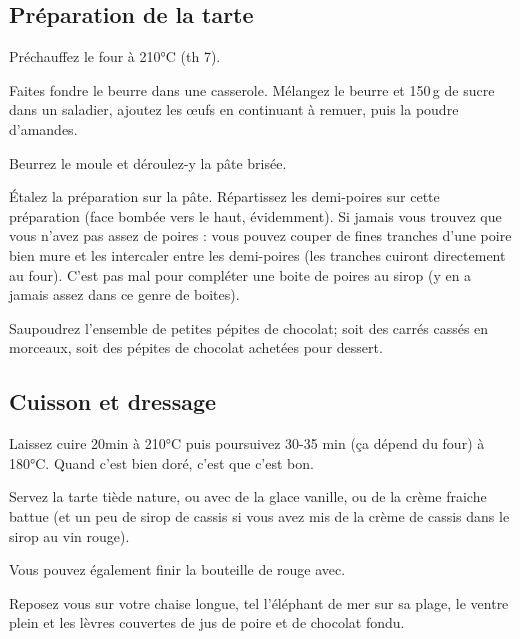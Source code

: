\subsection*{Préparation de la tarte}

\begin{instructions}
	
	\item Préchauffez le four à 210°C (th 7).
	\item Faites fondre le beurre dans une casserole. Mélangez le beurre et
	150\,g de sucre dans un saladier, ajoutez les œufs en continuant à remuer,
	puis la poudre d'amandes.
	\item Beurrez le moule et déroulez-y la pâte brisée.
	\item Étalez la préparation sur la pâte. Répartissez les demi-poires sur
	cette préparation (face bombée vers le haut, évidemment). Si jamais vous
	trouvez que vous n'avez pas assez de poires : vous pouvez couper de fines
	tranches d'une poire bien mure et les intercaler entre les demi-poires
	(les tranches cuiront directement au four). C'est pas mal pour compléter
	une boite de poires au sirop (y en a jamais assez dans ce genre de
	boites).
	\item Saupoudrez l'ensemble de petites pépites de chocolat; soit des
	carrés cassés en morceaux, soit des pépites de chocolat achetées pour
	dessert.

\end{instructions}

\subsection*{Cuisson et dressage}

\begin{instructions}

	\item Laissez cuire 20min à 210°C puis poursuivez 30-35 min (ça dépend du
	four) à 180°C. Quand c'est bien doré, c'est que c'est bon.
	\item Servez la tarte tiède nature, ou avec de la glace vanille, ou de la
	crème fraiche battue (et un peu de sirop de cassis si vous avez mis de la
	crème de cassis dans le sirop au vin rouge).
	\item Vous pouvez également finir la bouteille de rouge avec.

\end{instructions}

Reposez vous sur votre chaise longue, tel l’éléphant de mer sur sa plage, le
ventre plein et les lèvres couvertes de jus de poire et de chocolat fondu.
